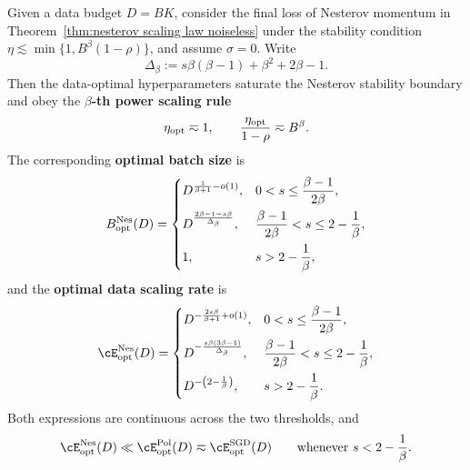 \begin{theorem}
\label{thm:nesterov data scaling noiseless}
Given a data budget \(D=BK\), consider the final loss of Nesterov momentum in Theorem~\ref{thm:nesterov scaling law noiseless} under the stability condition \(\eta\lesssim\min\{1,B^{\beta}(1-\rho)\}\), and assume \(\sigma=0\). Write
\[
    \Delta_{\beta}:=s\beta(\beta-1)+\beta^{2}+2\beta-1 .
\]
Then the data-optimal hyperparameters saturate the Nesterov stability boundary and obey the \textbf{\(\beta\)-th power scaling rule}
\[
    \eta_{\rm opt}\eqsim1,
    \qquad
    \frac{\eta_{\rm opt}}{1-\rho}\eqsim B^{\beta} .
\]
The corresponding \textbf{optimal batch size} is
\[
    B_{\rm opt}^{\rm Nes}(D)
    =
    \begin{cases}
    D^{\frac{1}{\beta+1}-o(1)},
    & 0<s\leq\dfrac{\beta-1}{2\beta},\\[3mm]
    D^{\frac{2\beta-1-s\beta}{\Delta_{\beta}}},
    & \dfrac{\beta-1}{2\beta}<s\leq2-\dfrac1\beta,\\[3mm]
    1,
    & s>2-\dfrac1\beta,
    \end{cases}
\]
and the \textbf{optimal data scaling rate} is
\[
    \cE_{\rm opt}^{\rm Nes}(D)
    =
    \begin{cases}
    D^{-\frac{2s\beta}{\beta+1}+o(1)},
    & 0<s\leq\dfrac{\beta-1}{2\beta},\\[3mm]
    D^{-\frac{s\beta(3\beta-1)}{\Delta_{\beta}}},
    & \dfrac{\beta-1}{2\beta}<s\leq2-\dfrac1\beta,\\[3mm]
    D^{-\left(2-\frac1\beta\right)},
    & s>2-\dfrac1\beta .
    \end{cases}
\]
Both expressions are continuous across the two thresholds, and
\[
    \cE_{\rm opt}^{\rm Nes}(D)
    \ll
    \cE_{\rm opt}^{\rm Pol}(D)
    \eqsim
    \cE_{\rm opt}^{\rm SGD}(D)
    \qquad\text{whenever } s<2-\frac1\beta .
\]
\end{theorem}

